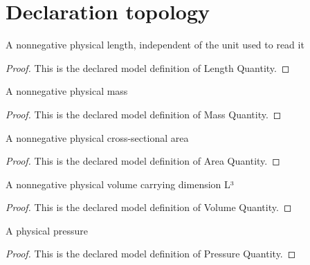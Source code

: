 \section{Declaration topology}
\begin{definition}
  \label{def:physics:phyx-mini-0374:phyxminiproblems-problemphyxmini0374-lengthquantity}
  A nonnegative physical length, independent of the unit used to read it
\end{definition}
\begin{proof}
  This is the declared model definition of Length Quantity.
\end{proof}
\begin{definition}
  \label{def:physics:phyx-mini-0374:phyxminiproblems-problemphyxmini0374-massquantity}
  A nonnegative physical mass
\end{definition}
\begin{proof}
  This is the declared model definition of Mass Quantity.
\end{proof}
\begin{definition}
  \label{def:physics:phyx-mini-0374:phyxminiproblems-problemphyxmini0374-areaquantity}
  A nonnegative physical cross-sectional area
\end{definition}
\begin{proof}
  This is the declared model definition of Area Quantity.
\end{proof}
\begin{definition}
  \label{def:physics:phyx-mini-0374:phyxminiproblems-problemphyxmini0374-volumequantity}
  A nonnegative physical volume carrying dimension L³
\end{definition}
\begin{proof}
  This is the declared model definition of Volume Quantity.
\end{proof}
\begin{definition}
  \label{def:physics:phyx-mini-0374:phyxminiproblems-problemphyxmini0374-pressurequantity}
  A physical pressure
\end{definition}
\begin{proof}
  This is the declared model definition of Pressure Quantity.
\end{proof}
